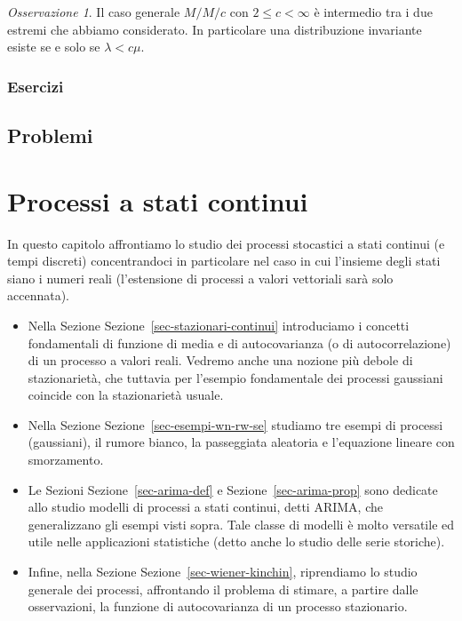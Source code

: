 \documentclass[
  italian,
  letterpaper,
]{book}
\theoremstyle{definition}
\theoremstyle{remark}
\newtheorem*{remark}{Osservazione}
\begin{document}
\begin{remark}
Il caso generale \(M/M/c\) con \(2 \le c < \infty\) è intermedio tra i
due estremi che abbiamo considerato. In particolare una distribuzione
invariante esiste se e solo se \(\lambda < c\mu\).
\end{remark}

\subsection{Esercizi}\label{esercizi-38}

\section{Problemi}\label{problemi-4}


\chapter{Processi a stati continui}\label{processi-a-stati-continui}

In questo capitolo affrontiamo lo studio dei processi stocastici a stati
continui (e tempi discreti) concentrandoci in particolare nel caso in
cui l'insieme degli stati siano i numeri reali (l'estensione di processi
a valori vettoriali sarà solo accennata).

\begin{itemize}
\item
  Nella Sezione Sezione~\ref{sec-stazionari-continui} introduciamo i
  concetti fondamentali di funzione di media e di autocovarianza (o di
  autocorrelazione) di un processo a valori reali. Vedremo anche una
  nozione più debole di stazionarietà, che tuttavia per l'esempio
  fondamentale dei processi gaussiani coincide con la stazionarietà
  usuale.
\item
  Nella Sezione Sezione~\ref{sec-esempi-wn-rw-se} studiamo tre esempi di
  processi (gaussiani), il rumore bianco, la passeggiata aleatoria e
  l'equazione lineare con smorzamento.
\item
  Le Sezioni Sezione~\ref{sec-arima-def} e Sezione~\ref{sec-arima-prop}
  sono dedicate allo studio modelli di processi a stati continui, detti
  ARIMA, che generalizzano gli esempi visti sopra. Tale classe di
  modelli è molto versatile ed utile nelle applicazioni statistiche
  (detto anche lo studio delle serie storiche).
\item
  Infine, nella Sezione Sezione~\ref{sec-wiener-kinchin}, riprendiamo lo
  studio generale dei processi, affrontando il problema di stimare, a
  partire dalle osservazioni, la funzione di autocovarianza di un
  processo stazionario.
\end{itemize}
\end{document}
